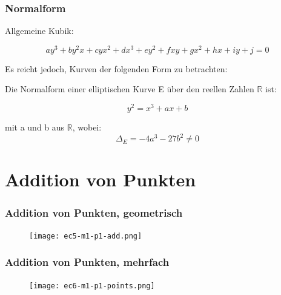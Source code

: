 \documentclass{beamer}
\newcommand{\R}{\mathbb{R}}
\begin{document}
\begin{frame}
  \frametitle{Normalform}
  Allgemeine Kubik:

  \begin{equation*}
    a y^3 + b y^2 x + c y x^2 + d x^3 + e y^2 + f x y + g x^2 +
    h x + i y + j = 0
  \end{equation*}

  Es reicht jedoch, Kurven der folgenden Form zu betrachten:

  \pause
  \begin{definition}
    Die Normalform einer elliptischen Kurve E über den reellen Zahlen
    $\R$ ist:

    \begin{equation}
      y^2 = x^3 + ax + b
      \label{eq:weier}
    \end{equation}

    mit a und b aus $\R$, wobei:
    \begin{equation}
      \Delta_E = -4a^3 - 27b^2 \ne 0
    \end{equation}
  \end{definition}
\end{frame}


\section{Addition von Punkten}

\begin{frame}
  \frametitle{Addition von Punkten, geometrisch}
  \begin{figure}
    \texttt{[image: ec5-m1-p1-add.png]}
  \end{figure}
\end{frame}

\begin{frame}
  \frametitle{Addition von Punkten, mehrfach}
  \begin{figure}
    \texttt{[image: ec6-m1-p1-points.png]}
  \end{figure}
\end{frame}
\end{document}
